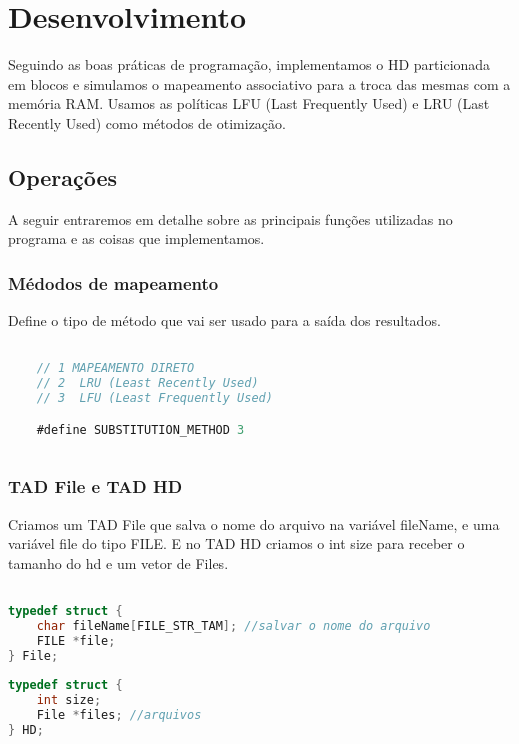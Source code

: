 \documentclass{article}
\begin{document}
\clearpage



\section{Desenvolvimento}

Seguindo as boas práticas de programação, implementamos o HD particionada em blocos e simulamos o mapeamento associativo para a troca das mesmas com a memória RAM. Usamos as políticas LFU (Last Frequently Used) e LRU (Last Recently Used) como métodos de otimização.



\subsection{Operações}

A seguir entraremos em detalhe sobre as principais funções utilizadas no programa e as coisas que implementamos.

\subsubsection{Médodos de mapeamento}

Define o tipo de método que vai ser usado para a saída dos resultados.

\begin{lstlisting}[caption={Definição do tipo de método},label={lst:cod1},language=C]

    // 1 MAPEAMENTO DIRETO
    // 2  LRU (Least Recently Used)
    // 3  LFU (Least Frequently Used)

    #define SUBSTITUTION_METHOD 3
    
\end{lstlisting}

\subsubsection{TAD File e TAD HD}

Criamos um TAD File que salva o nome do arquivo na variável fileName, e uma variável file do tipo FILE. E no TAD HD criamos o int size para receber o tamanho do hd
e um vetor de Files.

\begin{lstlisting}[caption={TAD Machine},label={lst:cod2},language=C]

typedef struct {
    char fileName[FILE_STR_TAM]; //salvar o nome do arquivo
    FILE *file;    
} File;
    
typedef struct {
    int size;
    File *files; //arquivos
} HD;

\end{lstlisting}
\end{document}
